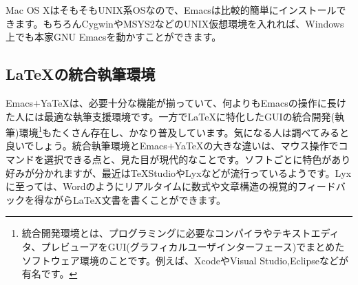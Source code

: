 Mac OS XはそもそもUNIX系OSなので、Emacsは比較的簡単にインストールできます。もちろんCygwinやMSYS2などのUNIX仮想環境を入れれば、Windows上でも本家GNU Emacsを動かすことができます。

\subsection{{\LaTeX}の統合執筆環境}
Emacs$+$YaTeXは、必要十分な機能が揃っていて、何よりもEmacsの操作に長けた人には最適な執筆支援環境です。一方で{\LaTeX}に特化したGUIの統合開発(執筆)環境\footnote{統合開発環境とは、プログラミングに必要なコンパイラやテキストエディタ、プレビューアをGUI(グラフィカルユーザインターフェース)でまとめたソフトウェア環境のことです。例えば、XcodeやVisual Studio,Eclipseなどが有名です。}もたくさん存在し、かなり普及しています。気になる人は調べてみると良いでしょう。統合執筆環境とEmacs$+$YaTeXの大きな違いは、マウス操作でコマンドを選択できる点と、見た目が現代的なことです。ソフトごとに特色があり好みが分かれますが、最近はTeXStudioやLyxなどが流行っているようです。Lyxに至っては、Wordのようにリアルタイムに数式や文章構造の視覚的フィードバックを得ながら{\LaTeX}文書を書くことができます。
